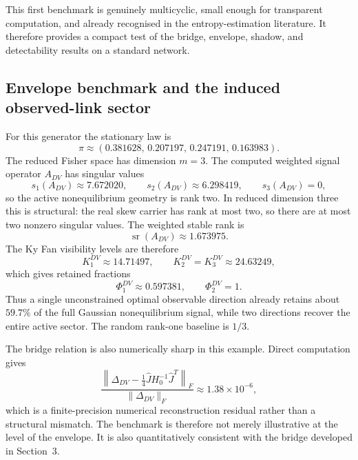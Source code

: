 \documentclass[11pt,a4paper]{article}
\numberwithin{equation}{section}
\theoremstyle{thmcompact}
\theoremstyle{remark}
\begin{document}
This first benchmark is genuinely multicyclic, small enough for transparent computation, and already recognised in the entropy-estimation literature. It therefore provides a compact test of the bridge, envelope, shadow, and detectability results on a standard network.

\subsection{Envelope benchmark and the induced observed-link sector}

For this generator the stationary law is
\begin{equation}
\pi\approx(0.381628,\,0.207197,\,0.247191,\,0.163983).
\end{equation}
The reduced Fisher space has dimension \(m=3\). The computed weighted signal operator \(A_{DV}\) has singular values
\begin{equation}
s_1(A_{DV})\approx 7.672020,
\qquad
s_2(A_{DV})\approx 6.298419,
\qquad
s_3(A_{DV})=0,
\end{equation}
so the active nonequilibrium geometry is rank two. In reduced dimension three this is structural: the real skew carrier has rank at most two, so there are at most two nonzero singular values. The weighted stable rank is
\begin{equation}
\operatorname{sr}(A_{DV})\approx 1.673975.
\end{equation}
The Ky Fan visibility levels are therefore
\begin{equation}
K_1^{DV}\approx 14.71497,
\qquad
K_2^{DV}=K_3^{DV}\approx 24.63249,
\end{equation}
which gives retained fractions
\begin{equation}
\Phi_1^{DV}\approx 0.597381,
\qquad
\Phi_2^{DV}=1.
\end{equation}
Thus a single unconstrained optimal observable direction already retains about \(59.7\%\) of the full Gaussian nonequilibrium signal, while two directions recover the entire active sector. The random rank-one baseline is \(1/3\).

The bridge relation is also numerically sharp in this example. Direct computation gives
\begin{equation}
\frac{\left\|\Delta_{DV}-\tfrac14\widehat J H_0^{-1}\widehat J^T\right\|_F}{\|\Delta_{DV}\|_F}
\approx 1.38\times 10^{-6},
\end{equation}
which is a finite-precision numerical reconstruction residual rather than a structural mismatch. The benchmark is therefore not merely illustrative at the level of the envelope. It is also quantitatively consistent with the bridge developed in Section~3.
\end{document}
